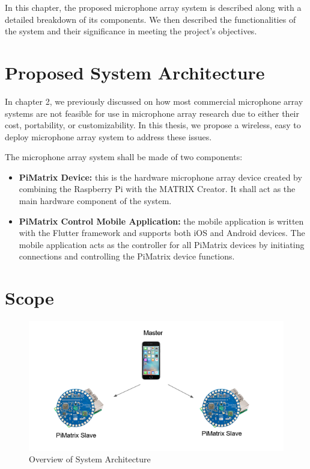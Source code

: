 \documentclass[hidelinks,12pt]{report} %
\begin{document}
In this chapter, the proposed microphone array system is described along with a detailed breakdown of its components. We then described the functionalities of the system and their significance in meeting the project’s objectives.

\section{Proposed System Architecture}

In chapter 2, we previously discussed on how most commercial microphone array systems are not feasible for use in microphone array research due to either their cost, portability, or customizability. In this thesis, we propose a wireless, easy to deploy microphone array system to address these issues. 

The microphone array system shall be made of two components:

	\begin{itemize}
		\item{\textbf{PiMatrix Device: }}
		this is the hardware microphone array device created by combining the Raspberry Pi with the MATRIX Creator. It shall act as the main hardware component of the system.
	
		\item{\textbf{PiMatrix Control Mobile Application: }}
		the mobile application is written with the Flutter framework and supports both iOS and Android devices. The mobile application acts as the controller for all PiMatrix devices by initiating connections and controlling the PiMatrix device functions. 
	
		
		\end{itemize}
	\section{Scope}

\begin{figure}[h]
\centering
\includegraphics[scale = 1.0]{fig3.1} 
\caption{Overview of System Architecture}
\label{fig}
\end{figure}
\end{document}

